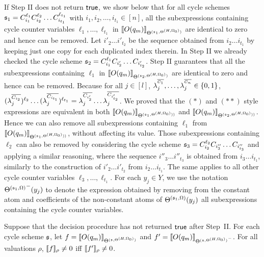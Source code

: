 \smallskip

If Step II does not return $\mathsf{true}$, we show below that for all cycle schemes ${\mathfrak{s} }_1=C_{i_1}^{\ell_1} C_{i_2}^{\ell_2} \dots C_{i_{t_1}}^{\ell_{t_1}}$ with $i_1,i_2,\dots,i_{t_1} \in [n]$, all the subexpressions containing cycle counter variables $\ell_1,\dots, \ell_{t_1}$ in $\llbracket O(q_{m})\rrbracket_{\Theta^{({\mathfrak{s} }_1, \Theta^{(H,\Omega_0)})}}$ are identical to zero and hence can be removed. Let ${i'_2} \dots {i'_{t_2}}$ be the sequence obtained from $i_2 \dots i_{t_1}$ by keeping just one copy for each duplicated index therein.  
In Step II we already checked the cycle scheme ${\mathfrak{s} }_2=C_{i_1}^{\ell_1} C_{i'_2} \dots C_{i'_{t_2}}$. Step II guarantees that all the subexpressions containing $\ell_1$ in 
$\llbracket O(q_{m})\rrbracket_{\Theta^{({\mathfrak{s} }_2, \Theta^{(H,\Omega_0)})}}$ are identical to zero and hence can be removed.
Because for all $j\in[l]$, $\lambda^{^{\overline{C_1}}}_j, \dots, \lambda^{^{\overline{C_n}}}_j \in \{0,1\}$,   $(\lambda^{\overline{C_{i_2}}}_{j})^{\ell_2} \dots (\lambda^{\overline{C_{i_{t_1}}}}_{j})^{\ell_{t_1}} = \lambda^{\overline{C_{i'_2}}}_{j} \dots \lambda^{\overline{C_{i'_{t_2}}}}_{j}$. We proved that the $(\ast)$ and $(\ast\ast)$ style expressions are equivalent in both $\llbracket O(q_{m})\rrbracket_{\Theta^{({\mathfrak{s} }_1, \Theta^{(H,\Omega_0)}))}}$ and $\llbracket O(q_{m})\rrbracket_{\Theta^{({\mathfrak{s} }_2, \Theta^{(H,\Omega_0)}))}}$.
Hence we can also remove all subexpressions containing $\ell_1$ from  $\llbracket O(q_{m})\rrbracket_{\Theta^{({\mathfrak{s} }_1, \Theta^{(H,\Omega_0)}))}}$, without affecting its value.
Those subexpressions containing $\ell_2$ can also be removed by considering the cycle scheme ${\mathfrak{s} }_3=C_{i_2}^{\ell_2} C_{i''_3} \dots C_{i''_{t_3}}$ and applying a similar reasoning, where the sequence ${i''_3} \dots {i''_{t_3}}$ is obtained from ${i_3} \dots  i_{t_1}$, similarly to the construction of ${i'_2} \dots {i'_{t_2}}$ from $i_2 \dots i_{t_1}$. The same applies to all other cycle counter variables $\ell_3,\dots,\ell_{t_1}$.
For each $y_j \in Y$, we use the notation ${\Theta^{({\mathfrak{s} }_1,\Omega)}}^-(y_j)$ to denote the expression obtained by removing from the constant atom and coefficients of the non-constant atoms of $\Theta^{({\mathfrak{s} }_1,\Omega)}(y_j)$ all subexpressions containing the cycle counter variables. 

\begin{lemma}\label{prop-bnd-domain-1}
	Suppose that the decision procedure has not returned $\mathsf{true}$ after Step~II. For each cycle scheme ${\mathfrak{s} }$, let $f=\llbracket O(q_{m})\rrbracket_{\Theta^{({\mathfrak{s} }, \Theta^{(H,\Omega_0)})}}$ and $f'=\llbracket O(q_{m})\rrbracket_{{\Theta^{({\mathfrak{s} }, \Theta^{(H,\Omega_0)})}}^-}$. For all valuations $\rho$, $\llbracket f\rrbracket_{\rho}\neq 0$ iff $\llbracket f'\rrbracket_{\rho} \neq 0$.
\end{lemma}



